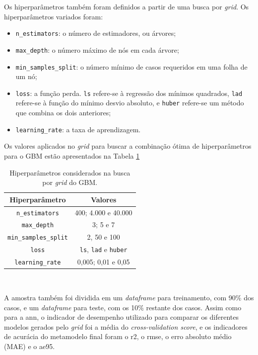 \documentclass{article}
\begin{document}
Os hiperparâmetros também foram definidos a partir de uma busca por \textit{grid}.
Os hiperparâmetros variados foram:

\begin{itemize}
    \item \texttt{n\_estimators}: o número de estimadores, ou árvores;
    \item \texttt{max\_depth}: o número máximo de nós em cada árvore;
    \item \texttt{min\_samples\_split}: o número mínimo de casos requeridos em uma folha de um nó;
    \item \texttt{loss}: a função perda. \texttt{ls} refere-se à regressão dos mínimos quadrados, \texttt{lad} refere-se à função do mínimo desvio absoluto, e \texttt{huber} refere-se um método que combina os dois anteriores;
    \item \texttt{learning\_rate}: a taxa de aprendizagem.
\end{itemize}

Os valores aplicados no \textit{grid} para buscar a combinação ótima de hiperparâmetros para o GBM estão apresentados na Tabela \ref{table:hiperparemtros}

\begin{table}[!htb]
	\centering
	\caption{Hiperparâmetros considerados na busca por \textit{grid} do GBM.}
	\label{table:hiperparemtros}
	\begin{tabular}{|c |c |}
		\hline
		\textbf{Hiperparâmetro} & \textbf{Valores} \\
		\hline
		\texttt{n\_estimators} & 400; 4.000 e 40.000 \\
		\hline
		\texttt{max\_depth} & 3; 5 e 7 \\
		\hline
		\texttt{min\_samples\_split} & 2, 50 e 100 \\
		\hline
		\texttt{loss} & \texttt{ls}, \texttt{lad} e \texttt{huber} \\
		\hline
		\texttt{learning\_rate} & 0,005; 0,01 e 0,05 \\
		\hline
	\end{tabular}\\
\end{table}

A amostra também foi dividida em um \textit{dataframe} para treinamento, com 90\% dos casos, e um \textit{dataframe} para teste, com os 10\% restante dos casos.
Assim como para a \acrshort{ann}, o indicador de desempenho utilizado para comparar os diferentes modelos gerados pelo \textit{grid} foi a média do \textit{cross-validation score}, e os indicadores de acurácia do metamodelo final foram o \acrfull{r2}, o \acrfull{rmse}, o erro absoluto médio (MAE) e o \acrfull{ae95}.
\end{document}
